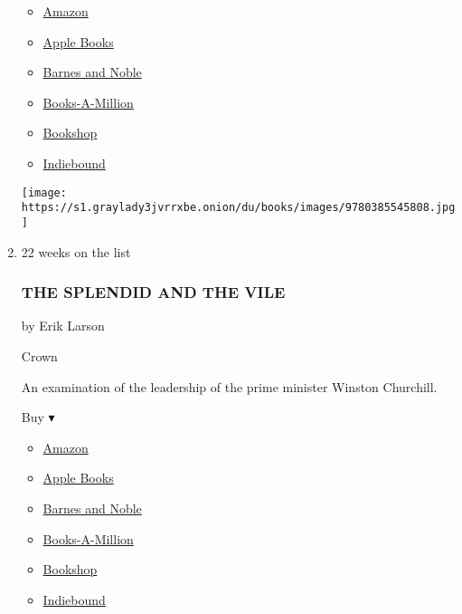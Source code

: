 \begin{enumerate}
  \begin{itemize}
  \tightlist
  \item
    \href{https://www.amazon.com/dp/0385545800?tag=NYTBSREV-20\&tag=NYTBS-20}{Amazon}
  \item
    \href{https://du-gae-books-dot-nyt-du-prd.appspot.com/buy?title=TWILIGHT+OF+DEMOCRACY\&author=Anne+Applebaum}{Apple
    Books}
  \item
    \href{https://www.anrdoezrs.net/click-7990613-11819508?url=https\%3A\%2F\%2Fwww.barnesandnoble.com\%2Fw\%2F\%3Fean\%3D9780385545808}{Barnes
    and Noble}
  \item
    \href{https://www.anrdoezrs.net/click-7990613-35140?url=https\%3A\%2F\%2Fwww.booksamillion.com\%2Fp\%2FTWILIGHT\%2BOF\%2BDEMOCRACY\%2FAnne\%2BApplebaum\%2F9780385545808}{Books-A-Million}
  \item
    \href{https://bookshop.org/a/3546/9780385545808}{Bookshop}
  \item
    \href{https://www.indiebound.org/book/9780385545808?aff=NYT}{Indiebound}
  \end{itemize}

  \texttt{[image: https://s1.graylady3jvrrxbe.onion/du/books/images/9780385545808.jpg]}
\item
  \href{https://www.nytimes3xbfgragh.onion/2020/02/25/books/review/the-splendid-and-the-vile-erik-larson.html}{}

  22 weeks on the list

  \hypertarget{the-splendid-and-the-vile}{%
  \subsubsection{THE SPLENDID AND THE
  VILE}\label{the-splendid-and-the-vile}}

  by Erik Larson

  Crown

  An examination of the leadership of the prime minister Winston
  Churchill.

  Buy ▾

  \begin{itemize}
  \tightlist
  \item
    \href{https://www.amazon.com/Splendid-Vile-Churchill-Family-Defiance/dp/0385348711?tag=NYTBS-20}{Amazon}
  \item
    \href{https://du-gae-books-dot-nyt-du-prd.appspot.com/buy?title=THE+SPLENDID+AND+THE+VILE\&author=Erik+Larson}{Apple
    Books}
  \item
    \href{https://www.anrdoezrs.net/click-7990613-11819508?url=https\%3A\%2F\%2Fwww.barnesandnoble.com\%2Fw\%2F\%3Fean\%3D9780385348713}{Barnes
    and Noble}
  \item
    \href{https://www.anrdoezrs.net/click-7990613-35140?url=https\%3A\%2F\%2Fwww.booksamillion.com\%2Fp\%2FTHE\%2BSPLENDID\%2BAND\%2BTHE\%2BVILE\%2FErik\%2BLarson\%2F9780385348713}{Books-A-Million}
  \item
    \href{https://bookshop.org/a/3546/9780385348713}{Bookshop}
  \item
    \href{https://www.indiebound.org/book/9780385348713?aff=NYT}{Indiebound}
  \end{itemize}


\end{enumerate}
